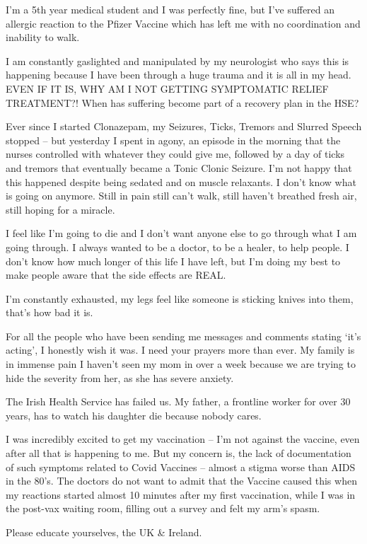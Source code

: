 I’m a 5th year medical student and I was perfectly fine, but I’ve suffered an
allergic reaction to the Pfizer Vaccine which has left me with no coordination
and inability to walk.

I am constantly gaslighted and manipulated by my neurologist who says this is
happening because I have been through a huge trauma and it is all in my
head. EVEN IF IT IS, WHY AM I NOT GETTING SYMPTOMATIC RELIEF TREATMENT?! When
has suffering become part of a recovery plan in the HSE?

Ever since I started Clonazepam, my Seizures, Ticks, Tremors and Slurred Speech
stopped – but yesterday I spent in agony, an episode in the morning that the
nurses controlled with whatever they could give me, followed by a day of ticks
and tremors that eventually became a Tonic Clonic Seizure. I’m not happy that
this happened despite being sedated and on muscle relaxants. I don’t know what
is going on anymore. Still in pain still can’t walk, still haven’t breathed
fresh air, still hoping for a miracle.

I feel like I’m going to die and I don’t want anyone else to go through what I
am going through. I always wanted to be a doctor, to be a healer, to help
people. I don’t know how much longer of this life I have left, but I’m doing my
best to make people aware that the side effects are REAL.

I’m constantly exhausted, my legs feel like someone is sticking knives into
them, that’s how bad it is.

For all the people who have been sending me messages and comments stating ‘it’s
acting’, I honestly wish it was. I need your prayers more than ever. My family
is in immense pain I haven’t seen my mom in over a week because we are trying to
hide the severity from her, as she has severe anxiety.

The Irish Health Service has failed us. My father, a frontline worker for over
30 years, has to watch his daughter die because nobody cares.

I was incredibly excited to get my vaccination – I’m not against the vaccine,
even after all that is happening to me. But my concern is, the lack of
documentation of such symptoms related to Covid Vaccines – almost a stigma worse
than AIDS in the 80’s. The doctors do not want to admit that the Vaccine caused
this when my reactions started almost 10 minutes after my first vaccination,
while I was in the post-vax waiting room, filling out a survey and felt my arm’s
spasm.

Please educate yourselves, the UK \& Ireland.
